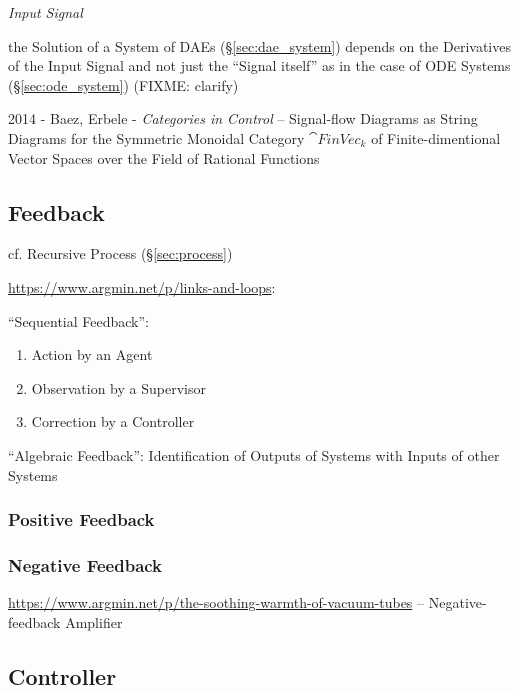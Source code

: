 \emph{Input Signal}

\fist the Solution of a System of DAEs (\S\ref{sec:dae_system}) depends on
the Derivatives of the Input Signal and not just the ``Signal itself'' as in
the case of ODE Systems (\S\ref{sec:ode_system})
(FIXME: clarify)

2014 - Baez, Erbele - \emph{Categories in Control} -- Signal-flow Diagrams as
String Diagrams for the Symmetric Monoidal Category $\cat{FinVec}_k$ of
Finite-dimentional Vector Spaces over the Field of Rational Functions



\subsection{Feedback}\label{sec:feedback}

cf. Recursive Process (\S\ref{sec:process})

\url{https://www.argmin.net/p/links-and-loops}:

``Sequential Feedback'':
\begin{enumerate}
  \item Action by an Agent
  \item Observation by a Supervisor
  \item Correction by a Controller
\end{enumerate}

``Algebraic Feedback'': Identification of Outputs of Systems with Inputs of
other Systems



\subsubsection{Positive Feedback}\label{sec:positive_feedback}

\subsubsection{Negative Feedback}\label{sec:negative_feedback}

\url{https://www.argmin.net/p/the-soothing-warmth-of-vacuum-tubes} --
Negative-feedback Amplifier



\subsection{Controller}\label{sec:controller}

